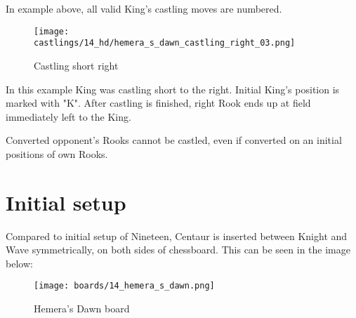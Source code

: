 In example above, all valid King's castling moves are numbered.

\noindent
\begin{figure}[!h]
\texttt{[image: castlings/14\_hd/hemera\_s\_dawn\_castling\_right\_03.png]}
\caption{Castling short right}
\label{fig:hemera_s_dawn_castling_right_03}
\end{figure}

In this example King was castling short to the right. Initial King's position is marked with "K".
After castling is finished, right Rook ends up at field immediately left to the King.

Converted opponent's Rooks cannot be castled, even if converted on an initial positions
of own Rooks.

\clearpage %

\section*{Initial setup}

Compared to initial setup of Nineteen, Centaur is inserted between Knight and Wave
symmetrically, on both sides of chessboard. This can be seen in the image below:

\noindent
\begin{figure}[h]
\texttt{[image: boards/14\_hemera\_s\_dawn.png]}
\caption{Hemera's Dawn board}
\label{fig:14_hemera_s_dawn}
\end{figure}

\clearpage %
